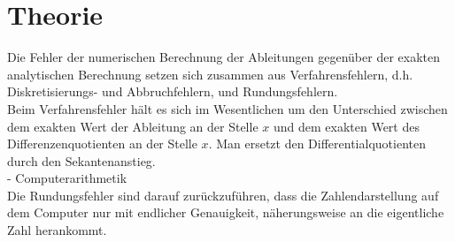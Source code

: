 \documentclass{scrartcl}
\begin{document}
\pagebreak \section{Theorie}
\label{sec:theorie}
Die Fehler der numerischen Berechnung der Ableitungen gegenüber der exakten analytischen Berechnung setzen sich zusammen aus Verfahrensfehlern, d.h. Diskretisierungs- und Abbruchfehlern, und Rundungsfehlern.\\
Beim Verfahrensfehler hält es sich im Wesentlichen um den Unterschied zwischen dem exakten Wert der Ableitung an der Stelle $x$ und dem exakten Wert des Differenzenquotienten an der Stelle $x$. Man ersetzt den Differentialquotienten durch den Sekantenanstieg.\\
- Computerarithmetik\\
Die Rundungsfehler sind darauf zurückzuführen, dass die Zahlendarstellung auf dem Computer nur mit endlicher Genauigkeit, näherungsweise an die eigentliche Zahl herankommt.
\end{document}
